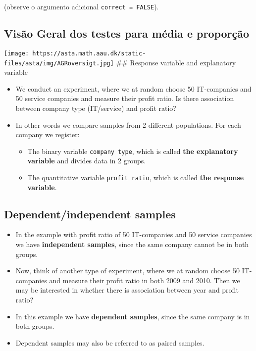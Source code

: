 \documentclass[]{article}
\providecommand{\tightlist}{%
  \setlength{\itemsep}{0pt}\setlength{\parskip}{0pt}}
\begin{document}
(observe o argumento adicional \texttt{correct\ =\ FALSE}).

\subsection{Visão Geral dos testes para média e
proporção}\label{visao-geral-dos-testes-para-media-e-proporcao}

\texttt{[image: https://asta.math.aau.dk/static-files/asta/img/AGRoversigt.jpg]}
\#\# Response variable and explanatory variable

\begin{itemize}
\tightlist
\item
  We conduct an experiment, where we at random choose 50 IT-companies
  and 50 service companies and measure their profit ratio. Is there
  association between company type (IT/service) and profit ratio?
\item
  In other words we compare samples from 2 different populations. For
  each company we register:

  \begin{itemize}
  \tightlist
  \item
    The binary variable \texttt{company\ type}, which is called
    \textbf{the explanatory variable} and divides data in 2 groups.
  \item
    The quantitative variable \texttt{profit\ ratio}, which is called
    \textbf{the response variable}.
  \end{itemize}
\end{itemize}

\subsection{Dependent/independent
samples}\label{dependentindependent-samples}

\begin{itemize}
\tightlist
\item
  In the example with profit ratio of 50 IT-companies and 50 service
  companies we have \textbf{independent samples}, since the same company
  cannot be in both groups.
\item
  Now, think of another type of experiment, where we at random choose 50
  IT-companies and measure their profit ratio in both 2009 and 2010.
  Then we may be interested in whether there is association between year
  and profit ratio?
\item
  In this example we have \textbf{dependent samples}, since the same
  company is in both groups.
\item
  Dependent samples may also be referred to as paired samples.
\end{itemize}
\end{document}
